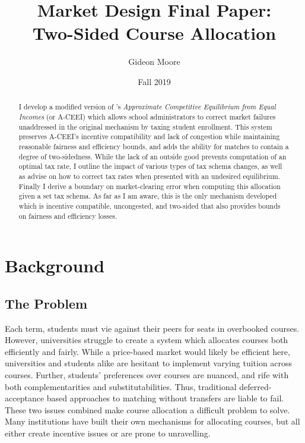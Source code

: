 \documentclass{article}
\title{Market Design Final Paper:\\Two-Sided Course Allocation}
\author{Gideon Moore}
\date{Fall 2019}
\begin{document}
\maketitle

\begin{abstract}
I develop a modified version of \textcite{budish2011}'s \emph{Approximate Competitive Equilibrium from Equal Incomes} (or A-CEEI) which allows school administrators to correct market failures unaddressed in the original mechanism by taxing student enrollment. This system preserves A-CEEI's incentive compatibility and lack of congestion while maintaining reasonable fairness and efficiency bounds, and adds the ability for matches to contain a degree of two-sidedness. While the lack of an outside good prevents computation of an optimal tax rate, I outline the impact of various types of tax schema changes, as well as advise on how to correct tax rates when presented with an undesired equilibrium. Finally I derive a boundary on market-clearing error when computing this allocation given a set tax schema. As far as I am aware, this is the only mechanism developed which is incentive compatible, uncongested, and two-sided that also provides bounds on fairness and efficiency losses.
\end{abstract}

\section{Background}

\subsection{The Problem}
Each term, students must vie against their peers for seats in overbooked courses. However, universities struggle to create a system which allocates courses both efficiently and fairly. While a price-based market would likely be efficient here, universities and students alike are hesitant to implement varying tuition across courses. Further, students' preferences over courses are nuanced, and rife with both complementarities and substitutabilities. Thus, traditional deferred-acceptance based approaches to matching without transfers are liable to fail. These two issues combined make course allocation a difficult problem to solve. Many institutions have built their own mechanisms for allocating courses, but all either create incentive issues or are prone to unravelling.
\end{document}
